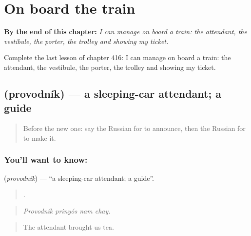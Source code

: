 
\chapter{On board the train}
\label{ch:ru-on-board-the-train}

\begin{chapteropening}
\textbf{By the end of this chapter:} \emph{I can manage on board a train: the attendant, the vestibule, the porter, the trolley and showing my ticket.}

Complete the last lesson of chapter 416: I can manage on board a train: the attendant, the vestibule, the porter, the trolley and showing my ticket.
\end{chapteropening}

\section[\texorpdfstring{\ru{проводник} (provodník)}{проводник (provodník)}]{ (provodník) — a sleeping-car attendant; a guide}

\label{lesson:RU-C416-provodnik}



\begin{quote}
Before the new one: say the Russian for to announce, then the Russian for to make it.
\end{quote}

\subsection*{You'll want to know: }
\textbf{} (\emph{provodník}) — \textquotedblleft{}a sleeping-car attendant; a guide\textquotedblright{}.

\begin{quote}
   .
\end{quote}

\begin{quote}
\emph{Provodník prinyós nam chay.}
\end{quote}

\begin{quote}
The attendant brought us tea.
\end{quote}

